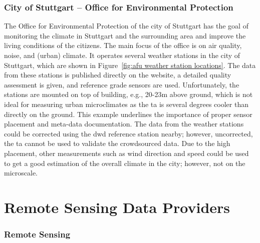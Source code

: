 \subsubsection{City of Stuttgart – Office for Environmental Protection}

The Office for Environmental Protection of the city of Stuttgart has the goal of monitoring the climate in Stuttgart and the surrounding area and improve the living conditions of the citizens. The main focus of the office is on air quality, noise, and (urban) climate. It operates several weather stations in the city of Stuttgart, which are shown in Figure~\ref{fig:afu weather station locations}. The data from these stations is published directly on the website, a detailed quality assessment is given, and reference grade sensors are used. Unfortunately, the stations are mounted on top of building, e.g., 20-23m above ground, which is not ideal for measuring urban microclimates as the \gls{ta} is several degrees cooler than directly on the ground. This example underlines the importance of proper sensor placement and meta-data documentation. The data from the weather stations could be corrected using the \gls{dwd} reference station nearby; however, uncorrected, the \gls{ta} cannot be used to validate the crowdsourced data. Due to the high placement, other measurements such as wind direction and speed could be used to get a good estimation of the overall climate in the city; however, not on the microscale.

\section{Remote Sensing Data Providers}

\subsubsection{Remote Sensing}
\label{subsec: remote sensing}

